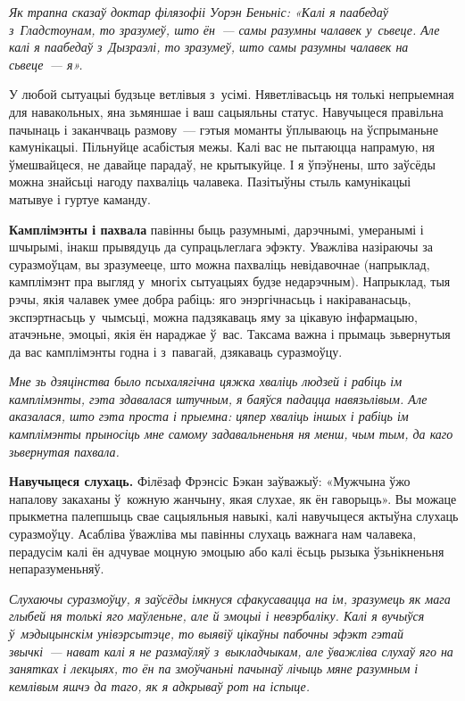 \emph{Як трапна сказаў доктар філязофіі Уорэн Беньніс: «Калі я паабедаў з~Гладстоунам, то зразумеў, што ён~--- самы разумны чалавек у~сьвеце. Але калі я паабедаў з~Дызраэлі, то зразумеў, што самы разумны чалавек на сьвеце~--- я».}

У любой сытуацыі будзьце ветлівыя з~усімі. Няветлівасьць ня толькі непрыемная для навакольных, яна зьмяншае і ваш сацыяльны статус. Навучыцеся правільна пачынаць і заканчваць размову~--- гэтыя моманты ўплываюць на ўспрыманьне камунікацыі. Пільнуйце асабістыя межы. Калі вас не пытаюцца напрамую, ня ўмешвайцеся, не давайце парадаў, не крытыкуйце. І я ўпэўнены, што заўсёды можна знайсьці нагоду пахваліць чалавека. Пазітыўны стыль камунікацыі матывуе і гуртуе каманду.

\textbf{Камплімэнты і пахвала} павінны быць разумнымі, дарэчнымі, умеранымі і шчырымі, інакш прывядуць да супрацьлеглага эфэкту. Уважліва назіраючы за суразмоўцам, вы зразумееце, што можна пахваліць невідавочнае (напрыклад, камплімэнт пра выгляд у~многіх сытуацыях будзе недарэчным). Напрыклад, тыя рэчы, якія чалавек умее добра рабіць: яго энэргічнасьць і накіраванасьць, экспэртнасьць у~чымсьці, можна падзякаваць яму за цікавую інфармацыю, атачэньне, эмоцыі, якія ён нараджае ў~вас. Таксама важна і прымаць зьвернутыя да вас камплімэнты годна і з~павагай, дзякаваць суразмоўцу.

\emph{Мне зь дзяцінства было псыхалягічна цяжка хваліць людзей і рабіць ім камплімэнты, гэта здавалася штучным, я баяўся падацца навязьлівым. Але аказалася, што гэта проста і прыемна: цяпер хваліць іншых і рабіць ім камплімэнты прыносіць мне самому задавальненьня ня менш, чым тым, да каго зьвернутая пахвала.}

\textbf{Навучыцеся слухаць.} Філёзаф Фрэнсіс Бэкан заўважыў: «Мужчына ўжо напалову закаханы ў~кожную жанчыну, якая слухае, як ён гаворыць». Вы можаце прыкметна палепшыць свае сацыяльныя навыкі, калі навучыцеся актыўна слухаць суразмоўцу. Асабліва ўважліва мы павінны слухаць важнага нам чалавека, перадусім калі ён адчувае моцную эмоцыю або калі ёсьць рызыка ўзьнікненьня непаразуменьняў.


\emph{Слухаючы суразмоўцу, я заўсёды імкнуся сфакусавацца на ім, зразумець як мага глыбей ня толькі яго маўленьне, але й эмоцыі і невэрбаліку. Калі я вучыўся ў~мэдыцынскім унівэрсытэце, то выявіў цікаўны пабочны эфэкт гэтай звычкі~--- нават калі я не размаўляў з~выкладчыкам, але ўважліва слухаў яго на занятках і лекцыях, то ён па змоўчаньні пачынаў лічыць мяне разумным і кемлівым яшчэ да таго, як я адкрываў рот на іспыце.}

